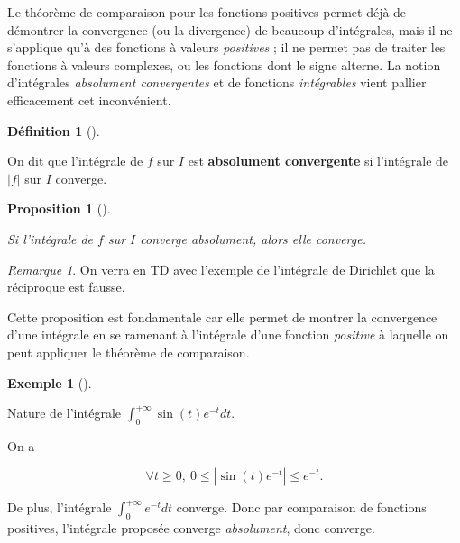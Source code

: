 \documentclass[
  french,
  letterpaper,
  DIV=11,
  numbers=noendperiod]{scrreprt}
\theoremstyle{plain}
\theoremstyle{definition}
\newtheorem{definition}{Définition}[chapter]
\theoremstyle{plain}
\newtheorem{proposition}{Proposition}[chapter]
\theoremstyle{plain}
\theoremstyle{definition}
\theoremstyle{definition}
\newtheorem{example}{Exemple}[chapter]
\theoremstyle{plain}
\theoremstyle{remark}
\newtheorem{refremark}{Remarque}[chapter]
\begin{document}
Le théorème de comparaison pour les fonctions positives permet déjà de
démontrer la convergence (ou la divergence) de beaucoup d'intégrales,
mais il ne s'applique qu'à des fonctions à valeurs \emph{positives} ; il
ne permet pas de traiter les fonctions à valeurs complexes, ou les
fonctions dont le signe alterne. La notion d'intégrales \emph{absolument
convergentes} et de fonctions \emph{intégrables} vient pallier
efficacement cet inconvénient.

\begin{definition}[]\protect\hypertarget{def-integrale-absolument-convergente}{}\label{def-integrale-absolument-convergente}

On dit que l'intégrale de \(f\) sur \(I\) est \textbf{absolument
convergente} si l'intégrale de \(|f|\) sur \(I\) converge.

\end{definition}

\begin{proposition}[]\protect\hypertarget{prp-absolue-convergence}{}\label{prp-absolue-convergence}

Si l'intégrale de \(f\) sur \(I\) converge absolument, alors elle
converge.

\end{proposition}

\begin{refremark}
On verra en TD avec l'exemple de l'intégrale de Dirichlet que la
réciproque est fausse.

\label{rem-contre-exemple}

\end{refremark}

Cette proposition est fondamentale car elle permet de montrer la
convergence d'une intégrale en se ramenant à l'intégrale d'une fonction
\emph{positive} à laquelle on peut appliquer le théorème de comparaison.

\begin{example}[]\protect\hypertarget{exm-convergence-absolue}{}\label{exm-convergence-absolue}

Nature de l'intégrale \(\int_{0}^{+\infty}\sin(t)e^{-t}dt\).

On a

\[
    \forall t \geqslant 0,\ 0 \leqslant \left|\sin(t)e^{-t}\right|
\leqslant e^{-t}.
\]

De plus, l'intégrale \(\int_{0}^{+\infty}e^{-t}dt\) converge. Donc par
comparaison de fonctions positives, l'intégrale proposée converge
\emph{absolument}, donc converge.

\end{example}
\end{document}
